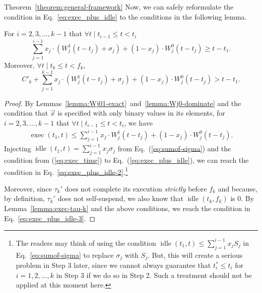 \begin{appProof}{Theorem~\ref{theorem:general-framework}}
Now, we can safely reformulate the condition in Eq.~\eqref{eq:exec_plus_idle} to the conditions in the following lemma.
\begin{Lemma}
  \label{lemma:conclusion-step2}
For $i=2,3,\ldots,k-1$ that $\forall t \mid t_{i-1} \leq t < t_i$
\begin{equation}
\label{eq:exec_plus_idle-2}
\sum_{j=1}^{i-1} x_j\cdot (W_j^1(t-t_j) +\sigma_j) + (1-x_j)\cdot W_j^0(t-t_j) \geq t-t_1.
\end{equation}
 Moreover, $\forall t \mid t_k \leq t < f_k$,
\begin{equation}
\label{eq:exec_plus_idle-3}
C'_k +\sum_{j=1}^{k-1} x_j\cdot (W_j^1(t-t_j) +\sigma_j) + (1-x_j)\cdot W_j^0(t-t_j) > t-t_1.
\end{equation} 
\end{Lemma}
\begin{proof}
  By Lemmas~\ref{lemma:Wj01-exact}~and~\ref{lemma:Wj0-dominate} and the condition that $\vec{x}$
  is specified with only binary values in its elements, for
  $i=2,3,\ldots,k-1$ that $\forall t \mid t_{i-1} \leq t < t_i$, we
  have
{\small \begin{align}
\label{eq:exec_time}
\operatorname{exec}(t_1, t) \leq \sum_{j=1}^{i-1} x_j\cdot W_j^1(t-t_j)  + (1-x_j)\cdot W_j^0(t-t_j).
\end{align}} Injecting $\operatorname{idle}(t_1, t) = \sum_{j=1}^{i-1}
x_j \sigma_j $ from Eq.~(\ref{eq:sumof-sigma}) and the condition from
(\ref{eq:exec_time}) to Eq.~(\ref{eq:exec_plus_idle}), we can reach
the condition in Eq.~\eqref{eq:exec_plus_idle-2}.\footnote{\label{footnote-why-sigma}The readers
  may think of using the condition $\operatorname{idle}(t_1, t) \leq
  \sum_{j=1}^{i-1} x_j S_j$ in Eq.~\eqref{eq:sumof-sigma} to
  replace $\sigma_j$ with $S_j$. But, this will create a serious
  problem in Step 3 later, since we cannot always guarantee that
  $t_i^*\leq t_i$ for $i=1,2,\ldots,k$ in Step 3 if we do so in Step 2. Such a treatment should not be applied at this moment here.} 

Moreover, since $\tau_k'$ does not complete its execution
\emph{strictly} before $f_k$ and because, by definition, $\tau_k'$
does not self-suspend, we also know that $\operatorname{idle}(t_k,
f_k)$ is $0$. By Lemma~\ref{lemma:exec-tau-k} and the above
conditions, we reach the condition in Eq.~\eqref{eq:exec_plus_idle-3}.
\end{proof}





\end{appProof}
